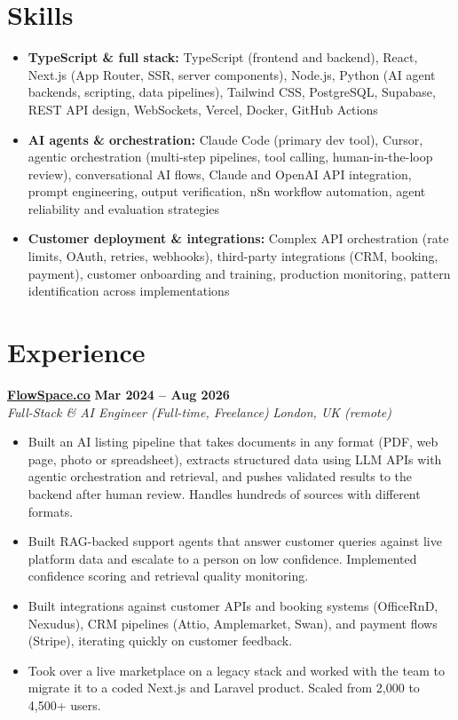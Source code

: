 \documentclass[a4paper,10pt]{article}
\newcommand{\role}[4]{%
 \textbf{#1} \hfill \textbf{#2}\\[1pt]%
 \textit{#3} \hfill \textit{#4}\\[2pt]%
}
\begin{document}
\section{Skills}
\begin{itemize}
 \item \textbf{TypeScript \& full stack:} TypeScript (frontend and backend), React, Next.js (App Router, SSR, server components), Node.js, Python (AI agent backends, scripting, data pipelines), Tailwind CSS, PostgreSQL, Supabase, REST API design, WebSockets, Vercel, Docker, GitHub Actions
 \item \textbf{AI agents \& orchestration:} Claude Code (primary dev tool), Cursor, agentic orchestration (multi-step pipelines, tool calling, human-in-the-loop review), conversational AI flows, Claude and OpenAI API integration, prompt engineering, output verification, n8n workflow automation, agent reliability and evaluation strategies
 \item \textbf{Customer deployment \& integrations:} Complex API orchestration (rate limits, OAuth, retries, webhooks), third-party integrations (CRM, booking, payment), customer onboarding and training, production monitoring, pattern identification across implementations
\end{itemize}

\section{Experience}

\role{\href{https://flowspace.co}{FlowSpace.co}}{Mar 2024 -- Aug 2026}{Full-Stack \& AI Engineer (Full-time, Freelance)}{London, UK (remote)}
\begin{itemize}
 \item Built an AI listing pipeline that takes documents in any format (PDF, web page, photo or spreadsheet), extracts structured data using LLM APIs with agentic orchestration and retrieval, and pushes validated results to the backend after human review. Handles hundreds of sources with different formats.
 \item Built RAG-backed support agents that answer customer queries against live platform data and escalate to a person on low confidence. Implemented confidence scoring and retrieval quality monitoring.
 \item Built integrations against customer APIs and booking systems (OfficeRnD, Nexudus), CRM pipelines (Attio, Amplemarket, Swan), and payment flows (Stripe), iterating quickly on customer feedback.
 \item Took over a live marketplace on a legacy stack and worked with the team to migrate it to a coded Next.js and Laravel product. Scaled from 2,000 to 4,500+ users.
\end{itemize}
\end{document}
